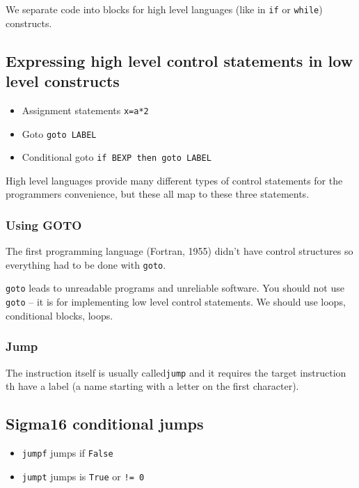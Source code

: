 We separate code into blocks for high level languages (like in \texttt{if} or \texttt{while}) constructs.

\subsection{Expressing high level control statements in low level constructs}\label{sub:expressing_high_level_control_statenmens_in_low_level_contrsucts}

\begin{itemize}
    \item Assignment statements \texttt{x=a*2}
    \item Goto \texttt{goto LABEL}
    \item Conditional goto \texttt{if BEXP then goto LABEL}
\end{itemize}
%
High level languages provide many different types of control statements for the programmers convenience, but these all map to these three statements.

\subsubsection{Using GOTO}\label{ssub:using_goto}

The first  programming language (Fortran, 1955) didn't have control structures so everything had to be done with \texttt{goto}.

\texttt{goto} leads to unreadable programs and unreliable software.
You should not use \texttt{goto} -- it is for implementing low level control statements.
We should use loops, conditional blocks, loops.

\subsubsection{Jump}\label{ssub:jump}

The instruction itself is usually called\texttt{jump} and it requires the target instruction th have a label (a name starting with a letter on the first character).

\subsection{Sigma16 conditional jumps}\label{sub:sigma16_conditional_jumps}

\begin{itemize}
    \item \texttt{jumpf} jumps if \texttt{False}
    \item \texttt{jumpt} jumps is \texttt{True} or \texttt{!= 0}
\end{itemize}

